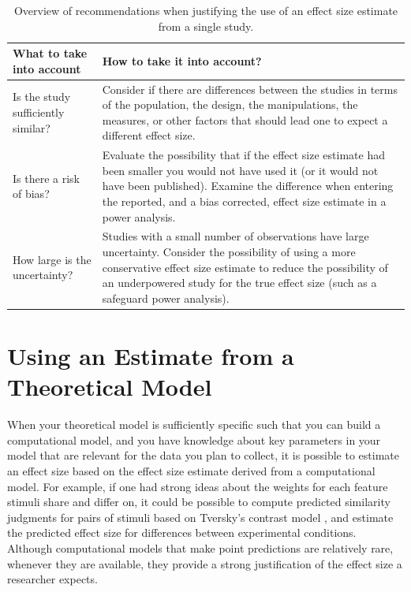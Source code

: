 \documentclass[
  oneside]{book}
\begin{document}
\begin{table}

\caption{\label{tab:table-es-just}Overview of recommendations when justifying the use of an effect size estimate from a single study.}
\centering
\begin{tabular}[t]{l|l}
\hline
What to take into account & How to take it into account?\\
\hline
Is the study sufficiently similar? & Consider if there are differences between the studies in terms of the population, the design, the manipulations, the measures, or other factors that should lead one to expect a different effect size.\\
\hline
Is there a risk of bias? & Evaluate the possibility that if the effect size estimate had been smaller you would not have used it (or it would not have been published). Examine the difference when entering the reported, and a bias corrected, effect size estimate in a power analysis.\\
\hline
How large is the uncertainty? & Studies with a small number of observations have large uncertainty. Consider the possibility of using a more conservative effect size estimate to reduce the possibility of an underpowered study for the true effect size (such as a safeguard power analysis).\\
\hline
\end{tabular}
\end{table}

\hypertarget{using-an-estimate-from-a-theoretical-model}{%
\section{Using an Estimate from a Theoretical Model}\label{using-an-estimate-from-a-theoretical-model}}

When your theoretical model is sufficiently specific such that you can build a computational model, and you have knowledge about key parameters in your model that are relevant for the data you plan to collect, it is possible to estimate an effect size based on the effect size estimate derived from a computational model. For example, if one had strong ideas about the weights for each feature stimuli share and differ on, it could be possible to compute predicted similarity judgments for pairs of stimuli based on Tversky's contrast model \citep{tversky_features_1977}, and estimate the predicted effect size for differences between experimental conditions. Although computational models that make point predictions are relatively rare, whenever they are available, they provide a strong justification of the effect size a researcher expects.
\end{document}
